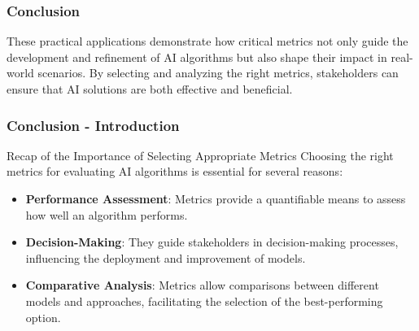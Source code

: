 \documentclass[aspectratio=169]{beamer}
\begin{document}
\begin{frame}[fragile]
    \frametitle{Conclusion}
    These practical applications demonstrate how critical metrics not only guide the development and refinement of AI algorithms but also shape their impact in real-world scenarios. By selecting and analyzing the right metrics, stakeholders can ensure that AI solutions are both effective and beneficial.
\end{frame}

\begin{frame}[fragile]
    \frametitle{Conclusion - Introduction}
    \begin{block}{Recap of the Importance of Selecting Appropriate Metrics}
        Choosing the right metrics for evaluating AI algorithms is essential for several reasons:
    \end{block}
    \begin{itemize}
        \item \textbf{Performance Assessment}: Metrics provide a quantifiable means to assess how well an algorithm performs.
        \item \textbf{Decision-Making}: They guide stakeholders in decision-making processes, influencing the deployment and improvement of models.
        \item \textbf{Comparative Analysis}: Metrics allow comparisons between different models and approaches, facilitating the selection of the best-performing option.
    \end{itemize}
\end{frame}
\end{document}
